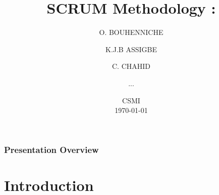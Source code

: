 \documentclass[
	11pt, %
]{beamer}
\title[Scrum Methodology]{ \textbf{SCRUM Methodology :} \\ \text{Team\_SCRUM}} %
\author[BOUHENNICHE \and ASSIGBE  \and RAHOUTI \and ...]{O. BOUHENNICHE \and K.J.B ASSIGBE \and C. CHAHID \and ...} %
\institute[]{University of Strasbourg } %
\date[\today]{ CSMI \\ \today} %
\begin{document}

\begin{frame}
	\titlepage %
\end{frame}



\begin{frame}
	\frametitle{Presentation Overview} %

	\tableofcontents %
\end{frame}


\section{Introduction} %
\end{document}
